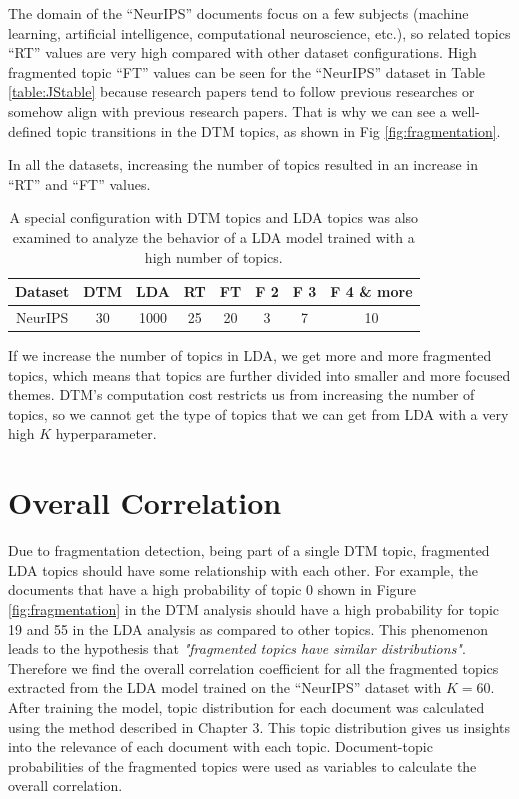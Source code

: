 \documentclass[a4paper]{report}
\begin{document}
The domain of the ``NeurIPS'' documents focus on a few subjects (machine learning, artificial intelligence, computational neuroscience, etc.), so related topics ``RT'' values are very high compared with other dataset configurations. High fragmented topic ``FT'' values can be seen for the ``NeurIPS'' dataset in Table \ref{table:JStable} because research papers tend to follow previous researches or somehow align with previous research papers. That is why we can see a well-defined topic transitions in the DTM topics, as shown in Fig \ref{fig:fragmentation}.

In all the datasets, increasing the number of topics resulted in an increase in ``RT'' and ``FT'' values.

\begin{table}[ht!]
\begin{center}
\begin{tabular}{|c|c|c|c|c|c|c|c|}
\hline \textbf{Dataset} & \textbf{DTM} & \textbf{LDA} & \textbf{RT}& \textbf{FT} & \textbf{F 2} & \textbf{F 3} & \textbf{F 4 \& more} \\ \hline
NeurIPS & 30 & 1000 & 25 & 20 & 3 & 7 & 10 \\ \hline
\end{tabular}
\caption{A special configuration with DTM topics and LDA topics was also examined to analyze the behavior of a LDA model trained with a high number of topics.}
\label{table:JS30DTM1000LDA}
\end{center}
\end{table}

If we increase the number of topics in LDA, we get more and more fragmented topics, which means that topics are further divided into smaller and more focused themes. DTM's computation cost restricts us from increasing the number of topics, so we cannot get the type of topics that we can get from LDA with a very high $K$ hyperparameter.

\section{Overall Correlation}
Due to fragmentation detection, being part of a single DTM topic, fragmented LDA topics should have some relationship with each other. For example, the documents that have a high probability of topic 0 shown in Figure \ref{fig:fragmentation} in the DTM analysis should have a high probability for topic 19 and 55 in the LDA analysis as compared to other topics. This phenomenon leads to the hypothesis that \textit{"fragmented topics have similar distributions"}. Therefore we find the overall correlation coefficient for all the fragmented topics extracted from the LDA model trained on the ``NeurIPS'' dataset with $K = 60$.
After training the model, topic distribution for each document was calculated using the method described in Chapter 3. This topic distribution gives us insights into the relevance of each document with each topic. Document-topic probabilities of the fragmented topics were used as variables to calculate the overall correlation.
\end{document}
